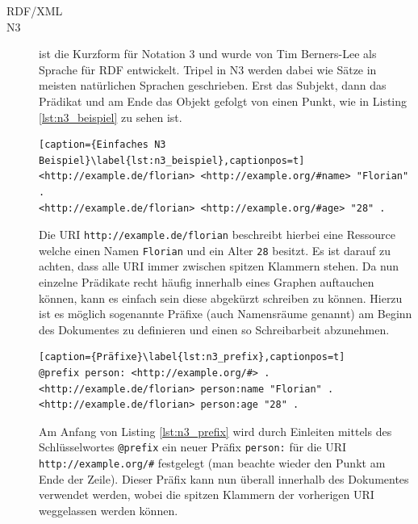 \begin{description}
    \item[RDF/XML] 
    \item[N3] ist die Kurzform für Notation 3 und wurde von Tim Berners-Lee als Sprache für RDF entwickelt. Tripel in N3 werden dabei wie Sätze in meisten natürlichen Sprachen geschrieben. Erst das Subjekt, dann das Prädikat und am Ende das Objekt gefolgt von einen Punkt, wie in  Listing \ref{lst:n3_beispiel} zu sehen ist.
    \begin{lstlisting}[caption={Einfaches N3 Beispiel}\label{lst:n3_beispiel},captionpos=t]
<http://example.de/florian> <http://example.org/#name> "Florian" .
<http://example.de/florian> <http://example.org/#age> "28" .    \end{lstlisting} 
    Die URI \texttt{http://example.de/florian} beschreibt hierbei eine Ressource welche einen Namen \texttt{Florian} und ein Alter \texttt{28} besitzt. Es ist darauf zu achten, dass alle URI immer zwischen spitzen Klammern stehen. Da nun einzelne Prädikate recht häufig innerhalb eines Graphen auftauchen können, kann es einfach sein diese abgekürzt schreiben zu können. Hierzu ist es möglich sogenannte Präfixe (auch Namensräume genannt) am Beginn des Dokumentes zu definieren und einen so Schreibarbeit abzunehmen.

    \begin{lstlisting}[caption={Präfixe}\label{lst:n3_prefix},captionpos=t]
@prefix person: <http://example.org/#> .
<http://example.de/florian> person:name "Florian" .
<http://example.de/florian> person:age "28" .    \end{lstlisting}

    Am Anfang von Listing \ref{lst:n3_prefix} wird durch Einleiten mittels des Schlüsselwortes \texttt{@prefix} ein neuer Präfix \texttt{person:} für die URI \texttt{http://example.org/\#} festgelegt (man beachte wieder den Punkt am Ende der Zeile). Dieser Präfix kann nun überall innerhalb des Dokumentes verwendet werden, wobei die spitzen Klammern der vorherigen URI weggelassen werden können.


\end{description}



